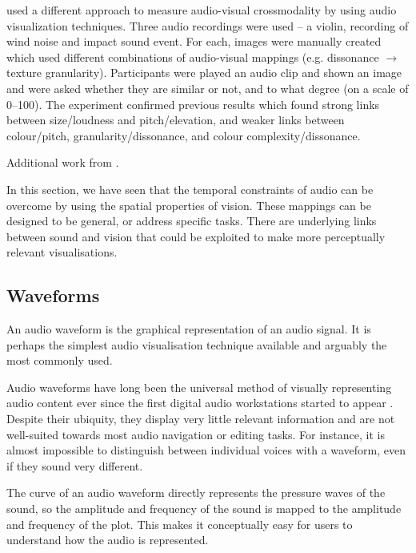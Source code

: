 \citet{Tsiros2014} used a different approach to measure audio-visual crossmodality by using audio visualization
techniques.  Three audio recordings were used -- a violin, recording of wind noise and impact sound event. For each,
images were manually created which used different combinations of audio-visual mappings (e.g. dissonance $\to$ texture
granularity). Participants were played an audio clip and shown an image and were asked whether they are similar or not,
and to what degree (on a scale of 0--100).  The experiment confirmed previous results which found strong links between
size/loudness and pitch/elevation, and weaker links between colour/pitch, granularity/dissonance, and colour
complexity/dissonance.

Additional work from \citet{Marks2003}.


In this section, we have seen that the temporal constraints of audio can be overcome by using the spatial properties of
vision. These mappings can be designed to be general, or address specific tasks. There are underlying links between
sound and vision that could be exploited to make more perceptually relevant visualisations.

\subsection{Waveforms}

An audio waveform is the graphical representation of an audio signal. It is perhaps the simplest audio visualisation
technique available and arguably the most commonly used.

Audio waveforms have long been the universal method of visually representing audio content ever since the first digital
audio workstations started to appear \citep{Massie1985}. Despite their ubiquity, they display very little relevant
information and are not well-suited towards most audio navigation or editing tasks. For instance, it is almost
impossible to distinguish between individual voices with a waveform, even if they sound very different.


The curve of an audio waveform directly represents the pressure waves of the sound, so the amplitude and frequency of
the sound is mapped to the amplitude and frequency of the plot. This makes it conceptually easy for users to
understand how the audio is represented.

